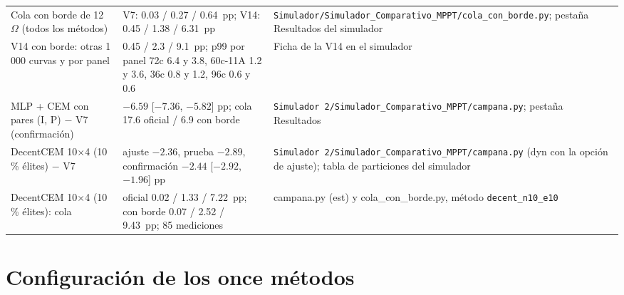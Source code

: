\documentclass[letterpaper,11pt]{article}
\begin{document}
\begin{table}[H]
\begin{tabularx}{\linewidth}{@{}p{4.3cm}p{4.0cm}L@{}}
    Cola con borde de 12~$\Omega$ (todos los métodos) & V7: 0.03 / 0.27 / 0.64~pp; V14: 0.45 / 1.38 / 6.31~pp & \nolinkurl{Simulador/Simulador_Comparativo_MPPT/cola_con_borde.py}; pestaña Resultados del simulador \\
    V14 con borde: otras 1\,000 curvas y por panel & 0.45 / 2.3 / 9.1~pp; p99 por panel 72c 6.4 y 3.8, 60c-11A 1.2 y 3.6, 36c 0.8 y 1.2, 96c 0.6 y 0.6 & Ficha de la V14 en el simulador \\
    MLP + CEM con pares (I, P) $-$ V7 (confirmación) & $-6.59$ [$-7.36$, $-5.82$] pp; cola 17.6 oficial / 6.9 con borde & \nolinkurl{Simulador 2/Simulador_Comparativo_MPPT/campana.py}; pestaña Resultados \\
    DecentCEM 10$\times$4 (10\,\% élites) $-$ V7 & ajuste $-2.36$, prueba $-2.89$, confirmación $-2.44$ [$-2.92$, $-1.96$] pp & \nolinkurl{Simulador 2/Simulador_Comparativo_MPPT/campana.py} (dyn con la opción de ajuste); tabla de particiones del simulador \\
    DecentCEM 10$\times$4 (10\,\% élites): cola & oficial 0.02 / 1.33 / 7.22~pp; con borde 0.07 / 2.52 / 9.43~pp; 85 mediciones & campana.py (est) y cola\_con\_borde.py, método \nolinkurl{decent_n10_e10} \\
    \bottomrule
  \end{tabularx}
\end{table}

\section{Configuración de los once métodos}
\end{document}
